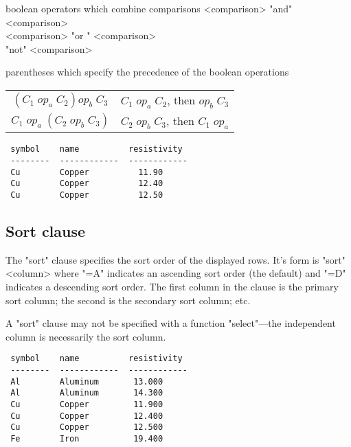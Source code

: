 \begin{List}
 \item[boolean operators] which combine comparisons
   \<<comparison> "and" <comparison> \\
                <comparison> "or " <comparison> \\
           \phantom{<comparison>} "not" <comparison>\>
 
 \item[parentheses] which specify the precedence
   of the boolean operations
 
     \begin{tabular}{cl}
     $(C_1\; op_a\; C_2) op_b\; C_3$&
        $C_1\; op_a\; C_2$, then $ op_b\; C_3$\\
     $C_1\; op_a\; (C_2\; op_b\; C_3)$&
        $C_2\; op_b\; C_3$, then $ C_1\; op_a$
     \end{tabular}
\end{List}
 
\begin{verbatim}
 symbol    name          resistivity
 --------  ------------  ------------
 Cu        Copper          11.90
 Cu        Copper          12.40
 Cu        Copper          12.50
\end{verbatim}
\enddemo
 
\subsection{Sort clause}
%
\label{sort-clause}
The "sort" clause specifies the sort order of the displayed
rows.
It's form is
\<"sort" 
  <column>  \opt{\ldots}\>
where "=A" indicates an ascending sort order (the default)
and "=D" indicates a descending sort order.
The first column in the clause is the primary sort column;
the second is the secondary sort column; etc.
 
A "sort" clause may not be specified with a function "select"---the
independent column is necessarily the sort column.
 
\begin{verbatim}
 symbol    name          resistivity
 --------  ------------  ------------
 Al        Aluminum       13.000
 Al        Aluminum       14.300
 Cu        Copper         11.900
 Cu        Copper         12.400
 Cu        Copper         12.500
 Fe        Iron           19.400
\end{verbatim}
\enddemo
{}
 

